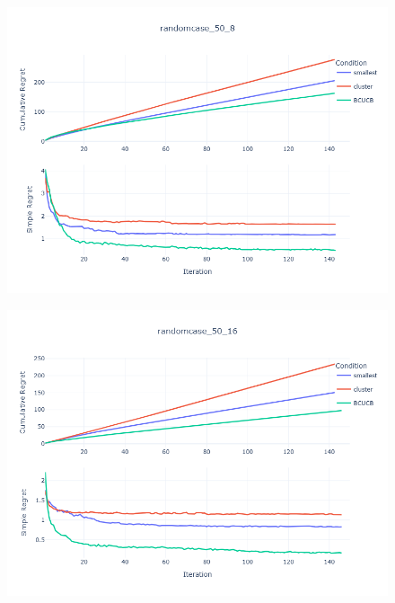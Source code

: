 \documentclass[opre,sglanonrev]{informs4}
\begin{document}
\begin{figure}[htbp]
\begin{minipage}[t]{0.48\textwidth}
        \includegraphics[width=\textwidth]{figures/random_50_8.png}
        \label{}
    \end{minipage}
    \hfill
    \begin{minipage}[t]{0.48\textwidth}
        \centering
        \includegraphics[width=\textwidth]{figures/random_50_16.png}
        \label{}
    \end{minipage}
\end{figure}
\end{document}
